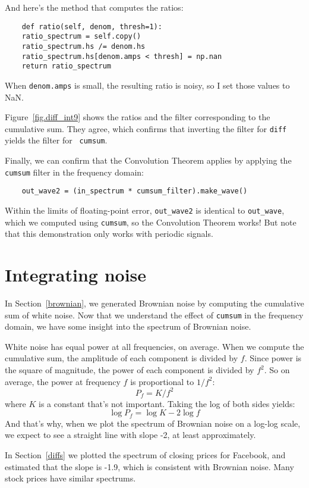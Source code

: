 And here's the method that computes the ratios:

\begin{verbatim}
	def ratio(self, denom, thresh=1):
	ratio_spectrum = self.copy()
	ratio_spectrum.hs /= denom.hs
	ratio_spectrum.hs[denom.amps < thresh] = np.nan
	return ratio_spectrum
\end{verbatim}

When {\tt denom.amps} is small, the resulting ratio is noisy,
so I set those values to NaN.

Figure~\ref{fig.diff_int9} shows the ratios and the filter
corresponding to the cumulative sum.  They agree, which confirms that
inverting the filter for {\tt diff} yields the filter for {\tt
	cumsum}.

Finally, we can confirm that the Convolution Theorem applies by
applying the {\tt cumsum} filter in the frequency domain:

\begin{verbatim}
	out_wave2 = (in_spectrum * cumsum_filter).make_wave()
\end{verbatim}

Within the limits of floating-point error, \verb"out_wave2" is
identical to \verb"out_wave", which we computed using {\tt cumsum}, so
the Convolution Theorem works!  But note that this demonstration only
works with periodic signals.


\section{Integrating noise}

In Section~\ref{brownian}, we generated Brownian noise by computing the
cumulative sum of white noise.
Now that we understand the effect of {\tt cumsum} in the frequency
domain, we have some insight into the spectrum of Brownian noise.

White noise has equal power at all frequencies, on average.  When we
compute the cumulative sum, the amplitude of each component is divided
by $f$.  Since power is the square of magnitude, the power of each
component is divided by $f^2$.  So on average, the power at frequency
$f$ is proportional to $1 / f^2$:
%
\[ P_f = K / f^2 \]
%
where $K$ is a constant that's not important.
Taking the log of both sides yields:
%
\[ \log P_f = \log K - 2 \log f \]
%
And that's why, when we plot the spectrum of Brownian noise on a
log-log scale, we expect to see a straight line with slope -2, at
least approximately.

In Section~\ref{diffs} we plotted the spectrum of closing prices for
Facebook, and estimated that the slope is -1.9, which is consistent
with Brownian noise.  Many stock prices have similar spectrums.

